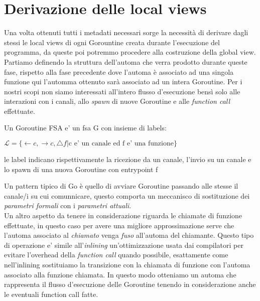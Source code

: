 \iffalse
    \subsection{Gestione degli stati finali}
\fi

\section{Derivazione delle local views}
Una volta ottenuti tutti i metadati necessari sorge la necessità di derivare dagli stessi le local views di ogni Gorountine creata durante l'esecuzione del programma, da queste poi potremmo procedere alla costruzione della global view.\bigskip\\
Partiamo definendo la struttura dell'automa che verra prodotto durante queste fase, rispetto alla fase precedente dove l'automa è associato ad una singola funzione qui l'automma ottenuto sarà associato ad un intera Goroutine. Per i nostri scopi non siamo interessati all'intero flusso d'esecuzione bensì solo alle interazioni con i canali, allo \emph{spawn} di nuove Goroutine e alle \emph{function call} effettuate. \\
\begin{definition}
    Un Goroutine FSA e' un fsa G con insieme di labels:
    \begin{center}
        $\mathcal{L} = \{ \leftarrow c, \rightarrow c, \bigtriangleup f | \text{c e' un canale ed f e' una funzione} \}$
    \end{center}
    le label indicano rispettivamente la ricezione da un canale, l'invio su un canale e lo spawn di una nuova Goroutine con entrypoint f
\end{definition}
Un pattern tipico di Go è quello di avviare Goroutine passando alle stesse il canale/i su cui comunnicare, questo comporta un meccanisco di sostituzione dei \emph{parametri formali} con i \emph{parametri attuali}. \\
Un altro aspetto da tenere in considerazione riguarda le chiamate di funzione effettuate, in questo caso per avere una migliore approssimazione serve che l'automa associato al \emph{chiamato} venga \emph{fuso} all'automa del chiamante. Questo tipo di operazione e' simile all'\emph{inlining} un'ottimizzazione usata dai compilatori per evitare l'overhead della \emph{function call} quando possibile, esattamente come nell'inlining sostituiamo la transizione con la chiamata di funzione con l'automa associato alla funzione chiamata. In questo modo otteniamo un automa che rappresenta il flusso d'esecuzione delle Goroutine tenendo in considerazione anche le eventuali function call fatte.\bigskip \\

